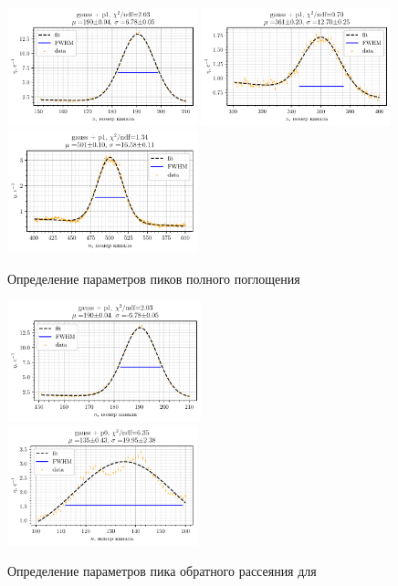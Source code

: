 \begin{figure}[h!]
    \centering
    \includegraphics[width=0.49\textwidth]{figures/eu_p1.pdf}
    \includegraphics[width=0.49\textwidth]{figures/eu_p2.pdf} 
    \\
    \includegraphics[width=0.49\textwidth]{figures/eu_p3.pdf}
    \vspace{-2mm}
    \caption{Определение параметров пиков полного поглощения \eu}
\end{figure}

\newpage

\begin{figure}[h!]
    \centering
    \includegraphics[width=0.5\textwidth]{figures/eu_bp2.pdf}
    \includegraphics[width=0.49\textwidth]{figures/eu_bp3.pdf}
    \vspace{-2mm}
    \caption{Определение параметров пика обратного рассеяния для \eu}
\end{figure}

